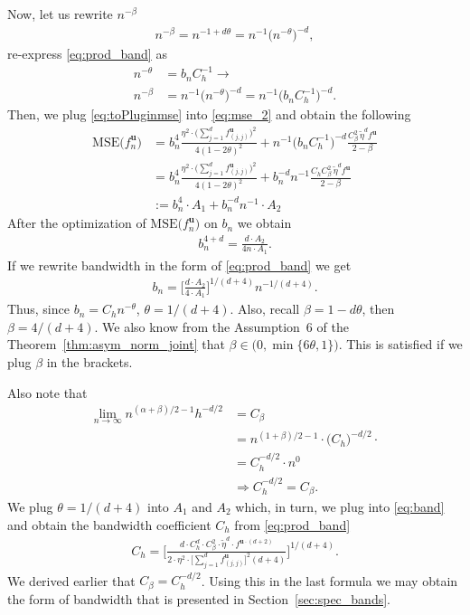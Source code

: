 \documentclass[12pt]{article}
\begin{document}
	Now, let us rewrite $ n^{-\beta} $
	\begin{align}
		n^{-\beta} = n^{-1+d\theta}= n^{-1}\big(n^{-\theta}\big)^{-d},
	\end{align}
	re-express \eqref{eq:prod_band} as 
	\begin{align}
		n^{-\theta} &= b_n C^{-1}_h \rightarrow \\
		n^{-\beta} &= n^{-1}\big(n^{-\theta}\big)^{-d}= n^{-1}\big(b_n C^{-1}_h\big)^{-d}. \label{eq:toPluginmse}
	\end{align}
	Then, we plug \eqref{eq:toPluginmse} into \eqref{eq:mse_2} and obtain the following
	\begin{align}
		\text{MSE}\big(f_n^{\mathbf{u}}\big) &= b^4_n \frac{\eta^2\!\cdot \big(\!\sum_{j=1}^{d}f^{\mathbf{u}}_{(j,j)}\big)^2} {4(1-2\theta)^2} + n^{-1}\big(b_n C^{-1}_h\big)^{-d} \frac{C_\beta^2\, \widetilde{\eta}^df^{\mathbf{u}}}{2-\beta} \\
		&= b^4_n \frac{\eta^2\!\cdot \big(\!\sum_{j=1}^{d}f^{\mathbf{u}}_{(j,j)}\big)^2} {4(1-2\theta)^2} + b_n^{-d} n^{-1} \frac{C_hC_\beta^2\, \widetilde{\eta}^df^{\mathbf{u}}}{2-\beta} \\
		&:= b^4_n\cdot A_1 + b_n^{-d} n^{-1} \cdot A_2
	\end{align}
	After the optimization of $ \text{MSE}\big(f_n^{\mathbf{u}}\big) $ on $ b_n $ we obtain
	\begin{align}
		b_n^{4+d} = \frac{d\cdot A_2}{4n\cdot A_1}.
	\end{align}
	If we rewrite bandwidth in the form of \eqref{eq:prod_band} we get
	\begin{align}
		b_n = \Bigg[\frac{d\cdot A_2}{4\cdot A_1}\Bigg]^{1/(d+4)}n^{-1/(d+4)}.\label{eq:band}
	\end{align}
	Thus, since $ b_n = C_h n^{-\theta} $, $ \theta = 1/(d+4) $. Also, recall $ \beta = 1-d\theta $, then $ \beta=4/(d+4) $. We also know from the Assumption~6 of the Theorem~\ref{thm:asym_norm_joint} that $ \beta \in \big(0, \min\{6\theta, 1\}\big) $. This is satisfied if we plug $ \beta $ in the brackets.
	
	Also note that
	\begin{align}
		\lim_{n \rightarrow \infty}n^{(\alpha+\beta)/2-1}h^{-d/2} &= C_\beta \\
		&= n^{(1+\beta)/2-1}\cdot\big(C_h\big)^{-d/2}\cdot \\
		&= C_h^{-d/2}\cdot n^{0} \\
		&\Rightarrow C_h^{-d/2} = C_\beta.
	\end{align}
	We plug $ \theta = 1/(d+4) $ into $ A_1 $ and $ A_2 $ which, in turn, we plug into \eqref{eq:band} and obtain the bandwidth coefficient $ C_h $ from \eqref{eq:prod_band}
	\begin{align}
		C_h = \Bigg[\frac{d\cdot C_h^d\cdot C_\beta^2\cdot \widetilde{\eta}^d \cdot f^{\mathbf{u}\cdot (d+2)}}{2\cdot \eta^2\cdot \big[\sum_{j=1}^{d}f^{\mathbf{u}}_{(j,j)}\big]^2(d+4)}\Bigg]^{1/(d+4)}.
	\end{align}
	We derived earlier that $ C_\beta=C^{-d/2}_h $. Using this in the last formula we may obtain the form of bandwidth that is presented in Section~\ref{sec:spec_bands}.
	
\end{document}
